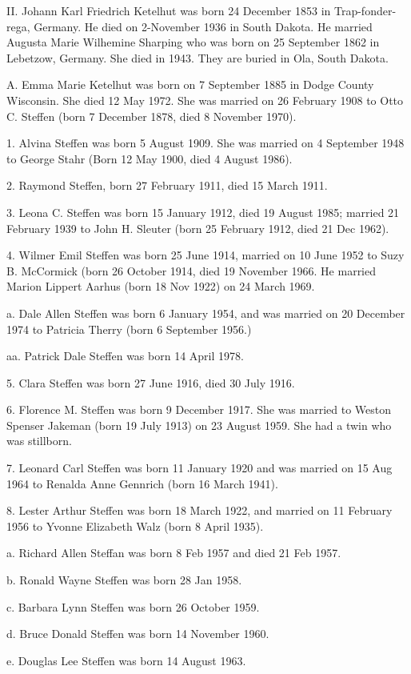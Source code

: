 \documentclass[a4paper]{article}
\begin{document}
II. Johann Karl Friedrich Ketelhut was born 24 December 1853 in Trap-fonder-rega, Germany.  He died on 2-November 1936 in South Dakota.  He married Augusta Marie Wilhemine Sharping who was born on 25 September 1862 in Lebetzow, Germany.  She died in 1943.  They are buried in Ola, South Dakota.

A. Emma Marie Ketelhut was born on 7 September 1885 in Dodge County Wisconsin.	She died 12 May 1972.  She was married on 26 February 1908 to Otto C. Steffen (born 7 December 1878, died 8 November 1970).
 
1.  Alvina Steffen was born 5 August 1909.  She was married on 4 September 1948 to George Stahr (Born 12 May 1900, died 4 August 1986).
 
2. Raymond Steffen, born 27 February 1911, died 15 March 1911.

3. Leona C. Steffen was born 15 January 1912, died 19 August 1985;  married 21 February 1939 to John H. Sleuter (born 25 February 1912, died 21 Dec 1962).
 
4. Wilmer Emil Steffen was born 25 June 1914, married on 10 June 1952 to Suzy B. McCormick (born 26 October 1914, died 19 November 1966.  He married Marion Lippert Aarhus (born 18 Nov 1922) on 24 March 1969.
  
a. Dale Allen Steffen was born 6 January 1954, and was married on 20 December 1974 to Patricia Therry (born 6 September 1956.)
 
aa. Patrick Dale Steffen was born 14 April 1978.

5. Clara Steffen was born 27 June 1916, died 30 July 1916.

6. Florence M. Steffen was born 9 December 1917.  She was married to Weston Spenser Jakeman (born 19 July 1913)  on 23 August 1959.  She  had a twin who was stillborn.

7. Leonard Carl Steffen was born 11 January 1920 and was married on 15 Aug 1964 to Renalda Anne Gennrich (born 16 March 1941).

8. Lester Arthur Steffen was born 18 March 1922, and married on 11 February 1956 to Yvonne Elizabeth Walz (born 8 April 1935).

a. Richard Allen Steffan was born 8 Feb 1957 and died 21 Feb 1957.

b. Ronald Wayne Steffen was born 28 Jan 1958.

c. Barbara Lynn Steffen was born 26 October 1959.

d. Bruce Donald Steffen was born 14 November 1960.

e. Douglas Lee Steffen was born 14 August 1963.
\end{document}

